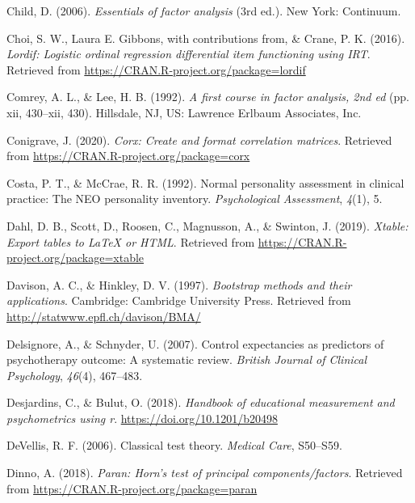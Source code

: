 \documentclass[
  man]{apa6}
\newlength{\cslhangindent}
\newlength{\cslentryspacingunit} %
\newenvironment{CSLReferences}[2] %
 {%
  \setlength{\parindent}{0pt}
  \ifodd #1
  \let\oldpar\par
  \def\par{\hangindent=\cslhangindent\oldpar}
  \fi
  \setlength{\parskip}{#2\cslentryspacingunit}
 }%
 {}
\begin{document}
\begin{CSLReferences}{1}{0}
\leavevmode{}%
Child, D. (2006). \emph{Essentials of factor analysis} (3rd ed.). New York: Continuum.

\leavevmode{}%
Choi, S. W., Laura E. Gibbons, with contributions from, \& Crane, P. K. (2016). \emph{Lordif: Logistic ordinal regression differential item functioning using IRT}. Retrieved from \url{https://CRAN.R-project.org/package=lordif}

\leavevmode{}%
Comrey, A. L., \& Lee, H. B. (1992). \emph{A first course in factor analysis, 2nd ed} (pp. xii, 430--xii, 430). Hillsdale, NJ, US: Lawrence Erlbaum Associates, Inc.

\leavevmode{}%
Conigrave, J. (2020). \emph{Corx: Create and format correlation matrices}. Retrieved from \url{https://CRAN.R-project.org/package=corx}

\leavevmode{}%
Costa, P. T., \& McCrae, R. R. (1992). Normal personality assessment in clinical practice: The NEO personality inventory. \emph{Psychological Assessment}, \emph{4}(1), 5.

\leavevmode{}%
Dahl, D. B., Scott, D., Roosen, C., Magnusson, A., \& Swinton, J. (2019). \emph{Xtable: Export tables to LaTeX or HTML}. Retrieved from \url{https://CRAN.R-project.org/package=xtable}

\leavevmode{}%
Davison, A. C., \& Hinkley, D. V. (1997). \emph{Bootstrap methods and their applications}. Cambridge: Cambridge University Press. Retrieved from \url{http://statwww.epfl.ch/davison/BMA/}

\leavevmode{}%
Delsignore, A., \& Schnyder, U. (2007). Control expectancies as predictors of psychotherapy outcome: A systematic review. \emph{British Journal of Clinical Psychology}, \emph{46}(4), 467--483.

\leavevmode{}%
Desjardins, C., \& Bulut, O. (2018). \emph{Handbook of educational measurement and psychometrics using r}. \url{https://doi.org/10.1201/b20498}

\leavevmode{}%
DeVellis, R. F. (2006). Classical test theory. \emph{Medical Care}, S50--S59.

\leavevmode{}%
Dinno, A. (2018). \emph{Paran: Horn's test of principal components/factors}. Retrieved from \url{https://CRAN.R-project.org/package=paran}


\end{CSLReferences}
\end{document}
